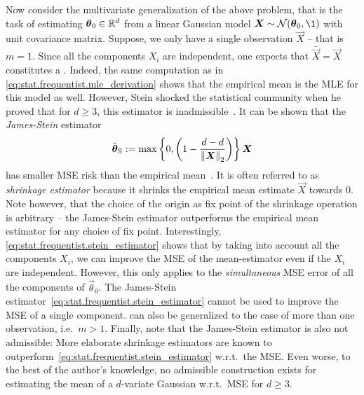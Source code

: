 Now consider the multivariate generalization of the above problem, that is the task of estimating ${\boldsymbol{\theta}}_0 \in \mathbb{R}^d$ from a linear Gaussian model $\vec X \sim \Normal(\vec\theta_0, \1)$ with unit covariance matrix.
Suppose, we only have a single observation $\vec X$ -- that is $m=1$.
Since all the components $X_i$ are independent, one expects that $\bar{\vec X} = \vec X$ constitutes a .
Indeed, the same computation as in \cref{eq:stat.frequentist.mle_derivation} shows that the empirical mean is the MLE for this model as well.
However, Stein shocked the statistical community when he proved that for $d \ge 3$, this estimator is inadmissible~\cite{Stein_1956_Inadmissibility}.
It can be shown that the \emph{James-Stein} estimator
\[
  \label{eq:stat.frequentist.stein_estimator}
  \hat{{\boldsymbol{\theta}}}_{\mathrm{S}} := \max\left\{0, \left( 1 - \frac{d - d}{{\Vert{\boldsymbol{X}}\Vert}_2} \right) \right\} {\boldsymbol{X}}
\]
has smaller MSE risk than the empirical mean~\cite{Stein_1956_Inadmissibility,Lehmann_1998_Theory}.
It is often referred to as \emph{shrinkage estimator} because it shrinks the empirical mean estimate $\vec X$ towards 0.
Note however, that the choice of the origin as fix point of the shrinkage operation is arbitrary -- the James-Stein estimator outperforms the empirical mean estimator for any choice of fix point.
Interestingly, \cref{eq:stat.frequentist.stein_estimator} shows that by taking into account all the components $X_i$, we can improve the MSE of the mean-estimator even if the $X_i$ are independent.
However, this only applies to the \emph{simultaneous} MSE error of all the components of $\vec \theta_0$.
The James-Stein estimator~\eqref{eq:stat.frequentist.stein_estimator} cannot be used to improve the MSE of a single component.
 can also be generalized to the case of more than one observation, i.e.\ $m > 1$.
Finally, note that the James-Stein estimator is also not admissible:
More elaborate shrinkage estimators are known to outperform~\eqref{eq:stat.frequentist.stein_estimator} w.r.t.\ the MSE.
Even worse, to the best of the author's knowledge, no admissible construction exists for estimating the mean of a $d$-variate Gaussian w.r.t.\ MSE for $d \ge 3$.\\


